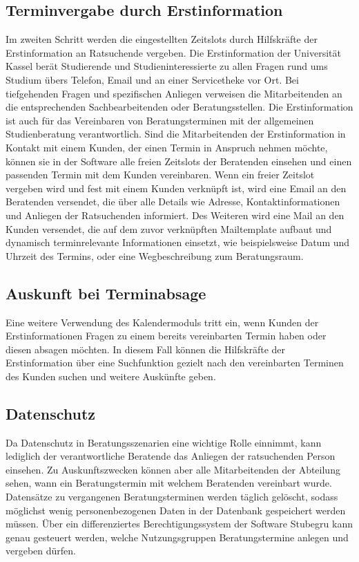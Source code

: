 \subsection*{Terminvergabe durch Erstinformation}
Im zweiten Schritt werden die eingestellten Zeitslots durch Hilfskräfte der
Erstinformation an Ratsuchende vergeben. Die Erstinformation der Universität
Kassel berät Studierende und Studieninteressierte zu allen Fragen rund ums
Studium übers Telefon, Email und an einer Servicetheke vor Ort. Bei
tiefgehenden Fragen und spezifischen Anliegen verweisen die Mitarbeitenden an
die entsprechenden Sachbearbeitenden oder Beratungsstellen. Die Erstinformation
ist auch für das Vereinbaren von Beratungsterminen mit der allgemeinen
Studienberatung verantwortlich. Sind die Mitarbeitenden der Erstinformation in
Kontakt mit einem Kunden, der einen Termin in Anspruch nehmen möchte, können
sie in der Software alle freien Zeitslots der Beratenden einsehen und einen
passenden Termin mit dem Kunden vereinbaren. Wenn ein freier Zeitslot vergeben
wird und fest mit einem Kunden verknüpft ist, wird eine Email an den Beratenden
versendet, die über alle Details wie Adresse, Kontaktinformationen und Anliegen
der Ratsuchenden informiert. Des Weiteren wird eine Mail an den Kunden
versendet, die auf dem zuvor verknüpften Mailtemplate aufbaut und dynamisch
terminrelevante Informationen einsetzt, wie beispielsweise Datum und Uhrzeit
des Termins, oder eine Wegbeschreibung zum Beratungsraum.

\subsection*{Auskunft bei Terminabsage}
Eine weitere Verwendung des Kalendermoduls tritt ein, wenn Kunden der
Erstinformationen Fragen zu einem bereits vereinbarten Termin haben oder diesen
absagen möchten. In diesem Fall können die Hilfskräfte der Erstinformation über
eine Suchfunktion gezielt nach den vereinbarten Terminen des Kunden suchen und
weitere Auskünfte geben.

\subsection*{Datenschutz}
Da Datenschutz in Beratungsszenarien eine wichtige Rolle einnimmt, kann
lediglich der verantwortliche Beratende das Anliegen der ratsuchenden Person
einsehen. Zu Auskunftszwecken können aber alle Mitarbeitenden der Abteilung
sehen, wann ein Beratungstermin mit welchem Beratenden vereinbart wurde.
Datensätze zu vergangenen Beratungsterminen werden täglich gelöscht, sodass
möglichst wenig personenbezogenen Daten in der Datenbank gespeichert werden
müssen. Über ein differenziertes Berechtigungssystem der Software Stubegru kann genau gesteuert werden, welche Nutzungsgruppen Beratungstermine anlegen
und vergeben dürfen.

